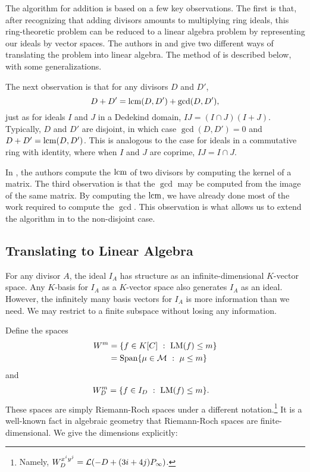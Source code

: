 The algorithm for addition is based on a few key observations.
The first is that, after recognizing that adding divisors amounts to multiplying ring ideals,
this ring-theoretic problem can be reduced to a linear algebra problem by representing our ideals by vector spaces.
The authors in \cite{salem07} and \cite{arita05-2} give two different ways of translating the problem into linear algebra.
The method of \cite{salem07} is described below, with some generalizations.

The next observation is that for any divisors $D$ and $D'$,
\begin{equation}
  \label{eq_lcm_plus_gcd}
  D + D' = \lcm(D, D') + \gcd(D, D'),
\end{equation}
just as for ideals $I$ and $J$ in a Dedekind domain, $IJ = (I \cap J)(I + J)$.
Typically, $D$ and $D'$ are disjoint, in which case $\gcd(D, D') = 0$ and $D + D' = \lcm(D, D')$.
This is analogous to the case for ideals in a commutative ring with identity,
where when $I$ and $J$ are coprime, $IJ = I \cap J$.

In \cite{salem07}, the authors compute the $\lcm$ of two divisors by computing the kernel of a matrix.
The third observation is that the $\gcd$ may be computed from the image of the same matrix.
By computing the $\lcm$, we have already done most of the work required to compute the $\gcd$.
This observation is what allows us to extend the algorithm in \cite{salem07} to the non-disjoint case.




\subsection{Translating to Linear Algebra}

For any divisor $A$, the ideal $I_A$ has structure as an infinite-dimensional $K$-vector space.
Any $K$-basis for $I_A$ as a $K$-vector space also generates $I_A$ as an ideal.
However, the infinitely many basis vectors for $I_A$ is more information than we need.
We may restrict to a finite subspace without losing any information.

Define the spaces
\begin{align*}
  W^m &= \{ f \in K[C] ~:~ \LM(f) \leq m \} \\
      &= \Span\{ \mu \in \cal M ~:~ \mu \leq m \}
\end{align*}
and
\begin{align*}
  W_D^m &= \{ f \in I_D ~:~ \LM(f) \leq m \}.
\end{align*}
These spaces are simply Riemann-Roch spaces under a different notation.\footnote
{Namely, $W_D^{x^iy^j} = \cal L(-D + (3i+4j)P_\infty)$.}
It is a well-known fact in algebraic geometry that Riemann-Roch spaces are finite-dimensional.
We give the dimensions explicitly:

